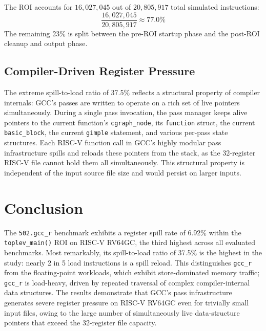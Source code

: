 \documentclass[conference]{IEEEtran}
\begin{document}
The ROI accounts for $16{,}027{,}045$ out of $20{,}805{,}917$
total simulated instructions:
\[
\frac{16{,}027{,}045}{20{,}805{,}917} \approx 77.0\%
\]
The remaining 23\% is split between the pre-ROI startup phase and
the post-ROI cleanup and output phase.

\subsection{Compiler-Driven Register Pressure}

The extreme spill-to-load ratio of 37.5\% reflects a structural
property of compiler internals: GCC's passes are written to operate
on a rich set of live pointers simultaneously. During a single pass
invocation, the pass manager keeps alive pointers to the current
function's \texttt{cgraph\_node}, its \texttt{function} struct, the
current \texttt{basic\_block}, the current \texttt{gimple} statement,
and various per-pass state structures. Each RISC-V function call in
GCC's highly modular pass infrastructure spills and reloads these
pointers from the stack, as the 32-register RISC-V file cannot hold
them all simultaneously. This structural property is independent of
the input source file size and would persist on larger inputs.

\section{Conclusion}

The \texttt{502.gcc\_r} benchmark exhibits a register spill rate of
6.92\% within the \texttt{toplev\_main()} ROI on RISC-V RV64GC, the
third highest across all evaluated benchmarks. Most remarkably, its
spill-to-load ratio of 37.5\% is the highest in the study: nearly
2 in 5 load instructions is a spill reload. This distinguishes
\texttt{gcc\_r} from the floating-point workloads, which exhibit
store-dominated memory traffic; \texttt{gcc\_r} is load-heavy,
driven by repeated traversal of complex compiler-internal data
structures. The results demonstrate that GCC's pass infrastructure
generates severe register pressure on RISC-V RV64GC even for trivially
small input files, owing to the large number of simultaneously live
data-structure pointers that exceed the 32-register file capacity.
\end{document}
